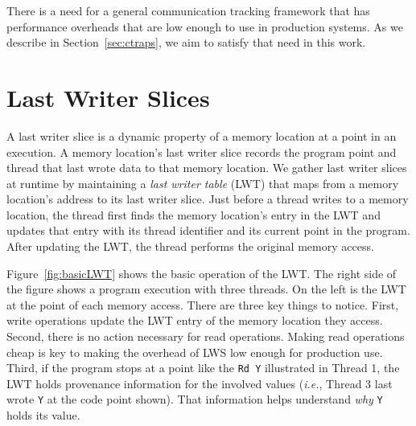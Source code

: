 \documentclass[pageno,nohyperref]{jpaper}
\newcommand{\lws}{LWS\xspace}
\newcommand{\lwt}{LWT\xspace}
\begin{document}
There is a need for a general communication tracking framework that has
performance overheads that are low enough to use in production systems.  As we
describe in Section~\ref{sec:ctraps}, we aim to satisfy that need in this work.








\section{Last Writer Slices}
\label{sec:lastwriterslices}
A last writer slice is a dynamic property of a memory location at a point in an
execution.   A memory location's last writer slice records the program point
and thread that last wrote data to that memory location.  We gather last writer
slices at runtime by maintaining a {\em last writer table} (\lwt) that maps
from a memory location's address to its last writer slice.  Just before a
thread writes to a memory location, the thread first finds the memory
location's entry in the \lwt and updates that entry with its thread identifier
and its current point in the program.  After updating the \lwt, the thread
performs the original memory access.  


Figure~\ref{fig:basicLWT} shows the basic operation of the \lwt.  The right
side of the figure shows a program execution with three threads.  On the left
is the \lwt at the point of each memory access.  There are three key things to
notice.  First, write operations update the \lwt entry of the memory location
they access.  Second, there is no action necessary for read operations.  Making
read operations cheap is key to making the overhead of \lws low
enough for production use.  Third, if the program stops at a point like the
{\tt Rd Y} illustrated in Thread 1, the \lwt holds provenance information for
the involved values ({\em i.e.}, Thread 3 last wrote {\tt Y} at the code point
shown). That information helps understand {\em why} {\tt Y} holds its value.
\end{document}
